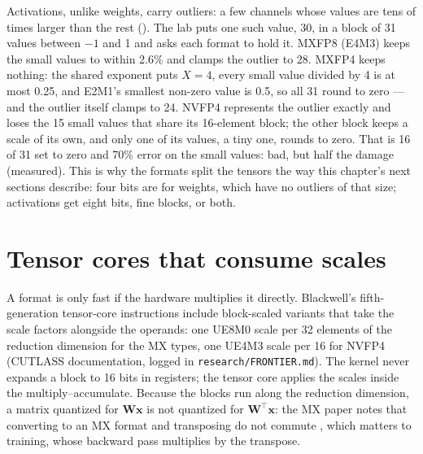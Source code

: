 Activations, unlike weights, carry outliers: a few channels whose values are
tens of times larger than the rest (). The lab puts
one such value, 30, in a block of 31 values between $-1$ and 1 and asks each
format to hold it. MXFP8 (E4M3) keeps the small values to within 2.6\% and
clamps the outlier to 28. MXFP4 keeps nothing: the shared exponent puts
$X = 4$, every small value divided by 4 is at most 0.25, and E2M1's smallest
non-zero value is 0.5, so all 31 round to zero --- and the outlier itself clamps
to 24. NVFP4 represents the outlier exactly and loses the 15 small values that
share its 16-element block; the other block keeps a scale of its own, and only
one of its values, a tiny one, rounds to zero. That is 16 of 31 set to zero and
70\% error on the small values: bad, but half the damage (measured).
This is why the formats split the tensors the way this chapter's next sections
describe: four bits are for weights, which have no outliers of that size;
activations get eight bits, fine blocks, or both.

\section{Tensor cores that consume scales}

A format is only fast if the hardware multiplies it directly. Blackwell's
fifth-generation tensor-core instructions include block-scaled variants that
take the scale factors alongside the operands: one UE8M0 scale per 32 elements
of the reduction dimension for the MX types, one UE4M3 scale per 16 for NVFP4
(CUTLASS documentation, logged in \texttt{research/FRONTIER.md}). The kernel
never expands a block to 16 bits in registers; the tensor core applies the
scales inside the multiply--accumulate. Because the blocks run along the
reduction dimension, a matrix quantized for $\mathbf{W}\mathbf{x}$ is not
quantized for $\mathbf{W}^{\top}\mathbf{x}$: the MX paper notes that converting
to an MX format and transposing do not commute \cite{rouhani2023mx}, which
matters to training, whose backward pass multiplies by the transpose.

